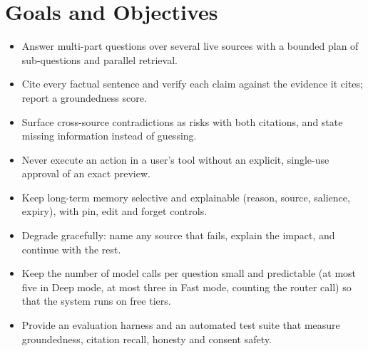 \documentclass[oneside,a4paper,12pt]{report}
\begin{document}
\section{Goals and Objectives}
\label{sec:goals}
\begin{itemize}
	\item Answer multi-part questions over several live sources with a bounded plan of sub-questions and parallel retrieval.
	\item Cite every factual sentence and verify each claim against the evidence it cites; report a groundedness score.
	\item Surface cross-source contradictions as risks with both citations, and state missing information instead of guessing.
	\item Never execute an action in a user's tool without an explicit, single-use approval of an exact preview.
	\item Keep long-term memory selective and explainable (reason, source, salience, expiry), with pin, edit and forget controls.
	\item Degrade gracefully: name any source that fails, explain the impact, and continue with the rest.
	\item Keep the number of model calls per question small and predictable (at most five in Deep mode, at most three in Fast mode, counting the router call) so that the system runs on free tiers.
	\item Provide an evaluation harness and an automated test suite that measure groundedness, citation recall, honesty and consent safety.
\end{itemize}
\end{document}
